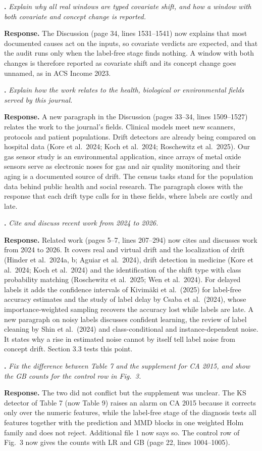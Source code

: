 \documentclass[11pt,a4paper]{article}
\newcounter{point}
\newcommand{\point}[1]{\par\medskip\stepcounter{point}\textbf{\thepoint. }\textit{#1}\par}
\newcommand{\reply}{\textbf{Response. }}
\begin{document}
\point{Explain why all real windows are typed covariate shift, and how a window with both covariate and concept change is reported.}
\reply The Discussion (page 34, lines 1531--1541) now explains that most documented causes act on the inputs, so covariate verdicts are expected, and that the audit runs only when the label-free stage finds nothing. A window with both changes is therefore reported as covariate shift and its concept change goes unnamed, as in ACS Income 2023.

\point{Explain how the work relates to the health, biological or environmental fields served by this journal.}
\reply A new paragraph in the Discussion (pages 33--34, lines 1509--1527) relates the work to the journal's fields. Clinical models meet new scanners, protocols and patient populations. Drift detectors are already being compared on hospital data (Kore et al.\ 2024; Koch et al.\ 2024; Roschewitz et al.\ 2025). Our gas sensor study is an environmental application, since arrays of metal oxide sensors serve as electronic noses for gas and air quality monitoring and their aging is a documented source of drift. The census tasks stand for the population data behind public health and social research. The paragraph closes with the response that each drift type calls for in these fields, where labels are costly and late.

\point{Cite and discuss recent work from 2024 to 2026.}
\reply Related work (pages 5--7, lines 207--294) now cites and discusses work from 2024 to 2026. It covers real and virtual drift and the localization of drift (Hinder et al.\ 2024a, b; Aguiar et al.\ 2024), drift detection in medicine (Kore et al.\ 2024; Koch et al.\ 2024) and the identification of the shift type with class probability matching (Roschewitz et al.\ 2025; Wen et al.\ 2024). For delayed labels it adds the confidence intervals of Kivimäki et al.\ (2025) for label-free accuracy estimates and the study of label delay by Csaba et al.\ (2024), whose importance-weighted sampling recovers the accuracy lost while labels are late. A new paragraph on noisy labels discusses confident learning, the review of label cleaning by Shin et al.\ (2024) and class-conditional and instance-dependent noise. It states why a rise in estimated noise cannot by itself tell label noise from concept drift. Section 3.3 tests this point.

\point{Fix the difference between Table 7 and the supplement for CA 2015, and show the GB counts for the control row in Fig.~3.}
\reply The two did not conflict but the supplement was unclear. The KS detector of Table 7 (now Table 9) raises an alarm on CA 2015 because it corrects only over the numeric features, while the label-free stage of the diagnosis tests all features together with the prediction and MMD blocks in one weighted Holm family and does not reject. Additional file 1 now says so. The control row of Fig.~3 now gives the counts with LR and GB (page 22, lines 1004--1005).
\end{document}
